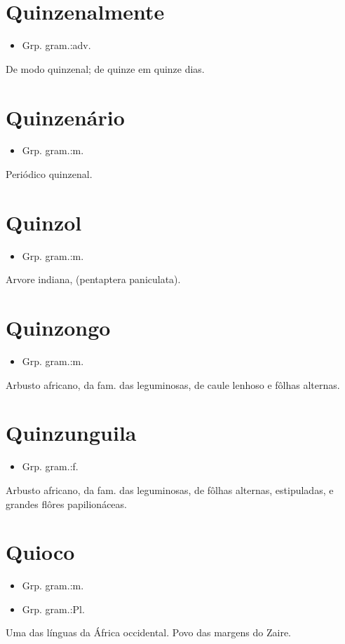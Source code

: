\section{Quinzenalmente}
\begin{itemize}
\item {Grp. gram.:adv.}
\end{itemize}
De modo quinzenal; de quinze em quinze dias.
\section{Quinzenário}
\begin{itemize}
\item {Grp. gram.:m.}
\end{itemize}
Periódico quinzenal.
\section{Quinzol}
\begin{itemize}
\item {Grp. gram.:m.}
\end{itemize}
Arvore indiana, (\textunderscore pentaptera paniculata\textunderscore ).
\section{Quinzongo}
\begin{itemize}
\item {Grp. gram.:m.}
\end{itemize}
Arbusto africano, da fam. das leguminosas, de caule lenhoso e fôlhas alternas.
\section{Quinzunguila}
\begin{itemize}
\item {Grp. gram.:f.}
\end{itemize}
Arbusto africano, da fam. das leguminosas, de fôlhas alternas, estipuladas, e grandes flôres papilionáceas.
\section{Quioco}
\begin{itemize}
\item {Grp. gram.:m.}
\end{itemize}
\begin{itemize}
\item {Grp. gram.:Pl.}
\end{itemize}
Uma das línguas da África occidental.
Povo das margens do Zaire.
